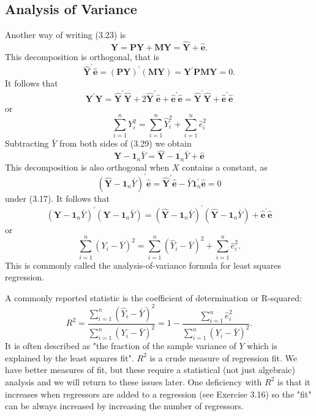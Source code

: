 \documentclass[10pt]{article}
\begin{document}
\subsection{Analysis of Variance}
Another way of writing (3.23) is
$$
\boldsymbol{Y}=\boldsymbol{P} \boldsymbol{Y}+\boldsymbol{M} \boldsymbol{Y}=\widehat{\boldsymbol{Y}}+\widehat{\boldsymbol{e}} .
$$
This decomposition is orthogonal, that is
$$
\widehat{\boldsymbol{Y}}^{\prime} \widehat{\boldsymbol{e}}=(\boldsymbol{P} \boldsymbol{Y})^{\prime}(\boldsymbol{M} \boldsymbol{Y})=\boldsymbol{Y}^{\prime} \boldsymbol{P} \boldsymbol{M} \boldsymbol{Y}=0 .
$$
It follows that
$$
\boldsymbol{Y}^{\prime} \boldsymbol{Y}=\widehat{\boldsymbol{Y}}^{\prime} \widehat{\boldsymbol{Y}}+2 \widehat{\boldsymbol{Y}}^{\prime} \widehat{\boldsymbol{e}}+\widehat{\boldsymbol{e}}^{\prime} \widehat{\boldsymbol{e}}=\widehat{\boldsymbol{Y}}^{\prime} \widehat{\boldsymbol{Y}}+\widehat{\boldsymbol{e}}^{\prime} \widehat{\boldsymbol{e}}
$$
or
$$
\sum_{i=1}^{n} Y_{i}^{2}=\sum_{i=1}^{n} \widehat{Y}_{i}^{2}+\sum_{i=1}^{n} \widehat{e}_{i}^{2}
$$
Subtracting $\bar{Y}$ from both sides of (3.29) we obtain
$$
\boldsymbol{Y}-\mathbf{1}_{n} \bar{Y}=\widehat{\boldsymbol{Y}}-\mathbf{1}_{n} \bar{Y}+\widehat{\boldsymbol{e}}
$$
This decomposition is also orthogonal when $X$ contains a constant, as
$$
\left(\widehat{\boldsymbol{Y}}-\mathbf{1}_{n} \bar{Y}\right)^{\prime} \widehat{\boldsymbol{e}}=\widehat{\boldsymbol{Y}}^{\prime} \widehat{\boldsymbol{e}}-\bar{Y} \mathbf{1}_{n}^{\prime} \widehat{\boldsymbol{e}}=0
$$
under (3.17). It follows that
$$
\left(\boldsymbol{Y}-\mathbf{1}_{n} \bar{Y}\right)^{\prime}\left(\boldsymbol{Y}-\mathbf{1}_{n} \bar{Y}\right)=\left(\widehat{\boldsymbol{Y}}-\mathbf{1}_{n} \bar{Y}\right)^{\prime}\left(\widehat{\boldsymbol{Y}}-\mathbf{1}_{n} \bar{Y}\right)+\widehat{\boldsymbol{e}}^{\prime} \widehat{\boldsymbol{e}}
$$
or
$$
\sum_{i=1}^{n}\left(Y_{i}-\bar{Y}\right)^{2}=\sum_{i=1}^{n}\left(\widehat{Y}_{i}-\bar{Y}\right)^{2}+\sum_{i=1}^{n} \widehat{e}_{i}^{2} .
$$
This is commonly called the analysis-of-variance formula for least squares regression.

A commonly reported statistic is the coefficient of determination or R-squared:
$$
R^{2}=\frac{\sum_{i=1}^{n}\left(\widehat{Y}_{i}-\bar{Y}\right)^{2}}{\sum_{i=1}^{n}\left(Y_{i}-\bar{Y}\right)^{2}}=1-\frac{\sum_{i=1}^{n} \widehat{e}_{i}^{2}}{\sum_{i=1}^{n}\left(Y_{i}-\bar{Y}\right)^{2}} .
$$
It is often described as "the fraction of the sample variance of $Y$ which is explained by the least squares fit". $R^{2}$ is a crude measure of regression fit. We have better measures of fit, but these require a statistical (not just algebraic) analysis and we will return to these issues later. One deficiency with $R^{2}$ is that it increases when regressors are added to a regression (see Exercise 3.16) so the "fit" can be always increased by increasing the number of regressors.
\end{document}
